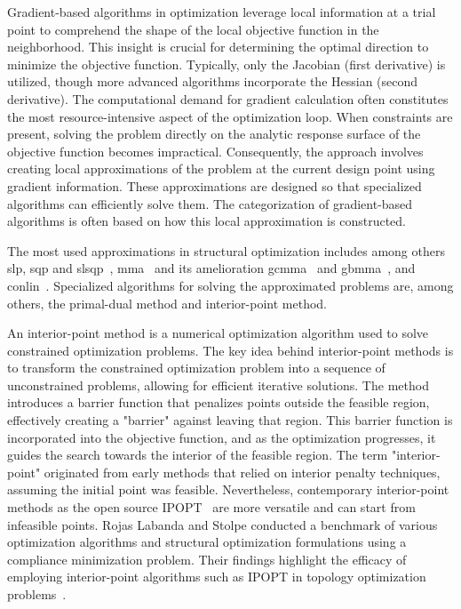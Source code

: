 Gradient-based algorithms in optimization leverage local information at a trial point to comprehend the shape of the local objective function in the neighborhood. This insight is crucial for determining the optimal direction to minimize the objective function. Typically, only the Jacobian (first derivative) is utilized, though more advanced algorithms incorporate the Hessian (second derivative). The computational demand for gradient calculation often constitutes the most resource-intensive aspect of the optimization loop. When constraints are present, solving the problem directly on the analytic response surface of the objective function becomes impractical. Consequently, the approach involves creating local approximations of the problem at the current design point using gradient information. These approximations are designed so that specialized algorithms can efficiently solve them. The categorization of gradient-based algorithms is often based on how this local approximation is constructed.

The most used approximations in structural optimization includes among others \gls{slp}, \gls{sqp} and \gls{slsqp}~, \gls{mma}~ and its amelioration \gls{gcmma}~ and \gls{gbmma}~, and \gls{conlin}~. Specialized algorithms for solving the approximated problems are, among others, the primal-dual method and interior-point method.

An interior-point method is a numerical optimization algorithm used to solve constrained optimization problems. The key idea behind interior-point methods is to transform the constrained optimization problem into a sequence of unconstrained problems, allowing for efficient iterative solutions. The method introduces a barrier function that penalizes points outside the feasible region, effectively creating a "barrier" against leaving that region. This barrier function is incorporated into the objective function, and as the optimization progresses, it guides the search towards the interior of the feasible region. The term "interior-point" originated from early methods that relied on interior penalty techniques, assuming the initial point was feasible. Nevertheless, contemporary interior-point methods as the open source IPOPT~ are more versatile and can start from infeasible points. Rojas Labanda and Stolpe conducted a benchmark of various optimization algorithms and structural optimization formulations using a compliance minimization problem. Their findings highlight the efficacy of employing interior-point algorithms such as IPOPT in topology optimization problems~.

